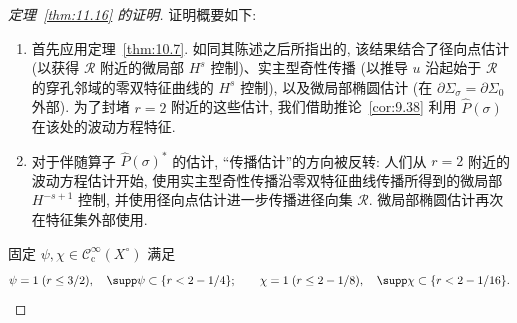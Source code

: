 \begin{proof}[定理~\ref{thm:11.16} 的证明]
证明概要如下:
\begin{enumerate}[label=(\arabic*)]
    \item 首先应用定理~\ref{thm:10.7}. 如同其陈述之后所指出的, 该结果结合了径向点估计 (以获得 $\mathcal{R}$ 附近的微局部 $H^s$ 控制)、实主型奇性传播 (以推导 $u$ 沿起始于 $\mathcal{R}$ 的穿孔邻域的零双特征曲线的 $H^s$ 控制), 以及微局部椭圆估计 (在 $\partial\Sigma_\sigma = \partial\Sigma_0$ 外部). 为了封堵 $r = 2$ 附近的这些估计, 我们借助推论~\ref{cor:9.38} 利用 $\widehat{P}(\sigma)$ 在该处的波动方程特征.
    \item 对于伴随算子 $\widehat{P}(\sigma)^*$ 的估计, “传播估计”的方向被反转: 人们从 $r = 2$ 附近的波动方程估计开始, 使用实主型奇性传播沿零双特征曲线传播所得到的微局部 $H^{-s+1}$ 控制, 并使用径向点估计进一步传播进径向集 $\mathcal{R}$. 微局部椭圆估计再次在特征集外部使用.
\end{enumerate}

固定 $\psi, \chi \in \mathcal{C}_{\mathrm{c}}^\infty(X^\circ)$ 满足
\begin{equation}\label{eq:11.62}
    \psi = 1 \; (r \le 3/2), \quad \supp\psi \subset \{r < 2 - 1/4\}; \qquad \chi = 1 \; (r \le 2 - 1/8), \quad \supp\chi \subset \{r < 2 - 1/16\}.
\end{equation}


\end{proof}
